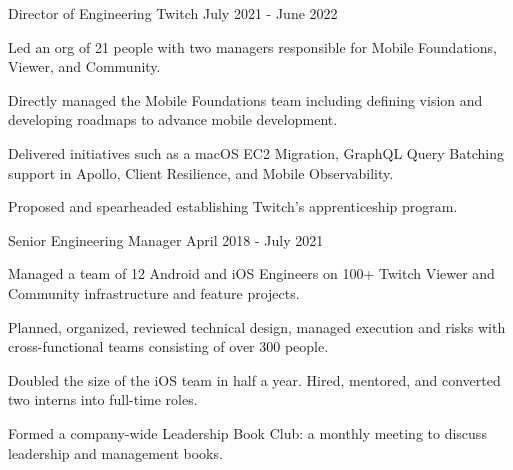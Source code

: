 \begin{cventries}
  \cventry
    {Director of Engineering} %
    {Twitch} %
    {} %
    {July 2021 - June 2022} %
    {
	\begin{cvitems} %
	\item Led an org of 21 people with two managers responsible for Mobile Foundations, Viewer, and Community.
	\item Directly managed the Mobile Foundations team including defining vision and developing roadmaps to advance mobile development.
	\item Delivered initiatives such as a macOS EC2 Migration, GraphQL Query Batching support in Apollo, Client Resilience, and Mobile Observability.
	\item Proposed and spearheaded establishing Twitch’s apprenticeship program.
	\end{cvitems}
    }

  \cventry
    {Senior Engineering Manager} %
    {} %
    {} %
    {April 2018 - July 2021} %
    {
	\begin{cvitems} %
	\item Managed a team of 12 Android and iOS Engineers on 100+ Twitch Viewer and Community infrastructure and feature projects.
	\item Planned, organized, reviewed technical design, managed execution and risks with cross-functional teams consisting of over 300 people.
	\item Doubled the size of the iOS team in half a year. Hired, mentored, and converted two interns into full-time roles.
	\item Formed a company-wide Leadership Book Club: a monthly meeting to discuss leadership and management books.
	\end{cvitems}
    }
    

\end{cventries}
